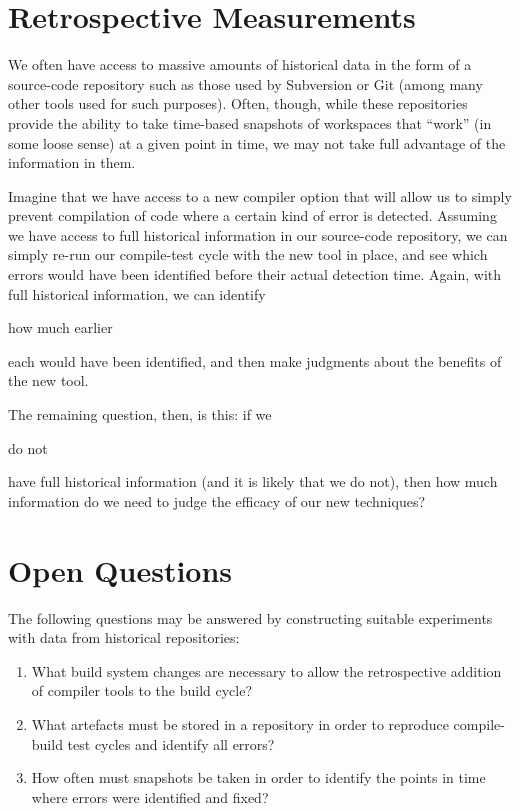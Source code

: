 \documentclass{eceasst}
\begin{document}
\section{Retrospective Measurements}

We often have access to massive amounts of historical data in the form
of a source-code repository such as those used by Subversion or Git
(among many other tools used for such purposes). Often, though, while
these repositories provide the ability to take time-based snapshots of
workspaces that ``work'' (in some loose sense) at a given point in
time, we may not take full advantage of the information in
them. 

Imagine that we have access to a new compiler option that will allow
us to simply prevent compilation of code where a certain kind of error
is detected. Assuming we have access to full historical information in
our source-code repository, we can simply re-run our compile-test
cycle with the new tool in place, and see which errors would have been
identified before their actual detection time.  Again, with full
historical information, we can identify \begin{em}how much
earlier\end{em} each would have been identified, and then make
judgments about the benefits of the new tool.

The remaining question, then, is this: if we \begin{em}do not\end{em} have
full historical information (and it is likely that we do not), then how
much information do we need to judge the efficacy of our new techniques?

\section{Open Questions}

The following questions may be answered by constructing suitable
experiments with data from historical repositories:

\begin{enumerate}
\item What build system changes are necessary to allow the retrospective
addition of compiler tools to the build cycle?

\item What artefacts must be stored in a repository in order to reproduce
compile-build test cycles and identify all errors?

\item How often must snapshots be taken in order to identify the points
in time where errors were identified and fixed?

\end{enumerate}



%
%
\end{document}
